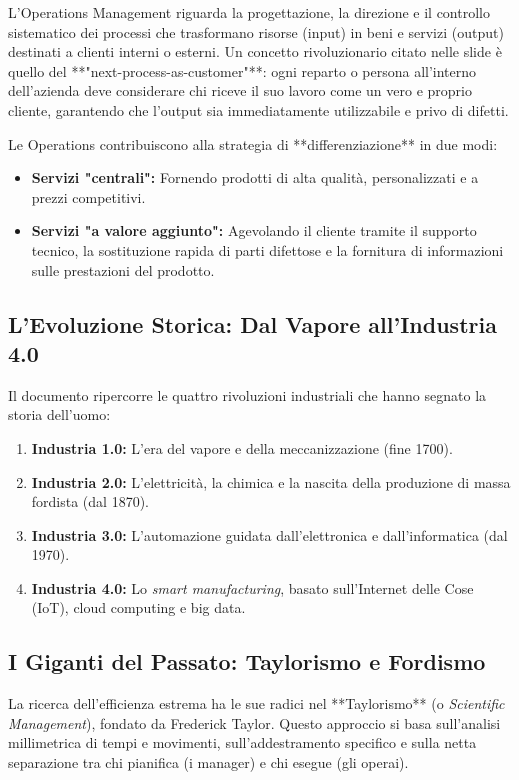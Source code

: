 \documentclass[a4paper,10pt]{article}
\begin{document}
L'Operations Management riguarda la progettazione, la direzione e il controllo sistematico dei processi che trasformano risorse (input) in beni e servizi (output) destinati a clienti interni o esterni. Un concetto rivoluzionario citato nelle slide è quello del **"next-process-as-customer"**: ogni reparto o persona all'interno dell'azienda deve considerare chi riceve il suo lavoro come un vero e proprio cliente, garantendo che l'output sia immediatamente utilizzabile e privo di difetti.

Le Operations contribuiscono alla strategia di **differenziazione** in due modi:
\begin{itemize}
    \item \textbf{Servizi "centrali":} Fornendo prodotti di alta qualità, personalizzati e a prezzi competitivi.
    \item \textbf{Servizi "a valore aggiunto":} Agevolando il cliente tramite il supporto tecnico, la sostituzione rapida di parti difettose e la fornitura di informazioni sulle prestazioni del prodotto.
\end{itemize}

\subsection*{L'Evoluzione Storica: Dal Vapore all'Industria 4.0}

Il documento ripercorre le quattro rivoluzioni industriali che hanno segnato la storia dell'uomo:
\begin{enumerate}
    \item \textbf{Industria 1.0:} L'era del vapore e della meccanizzazione (fine 1700).
    \item \textbf{Industria 2.0:} L'elettricità, la chimica e la nascita della produzione di massa fordista (dal 1870).
    \item \textbf{Industria 3.0:} L'automazione guidata dall'elettronica e dall'informatica (dal 1970).
    \item \textbf{Industria 4.0:} Lo \textit{smart manufacturing}, basato sull'Internet delle Cose (IoT), cloud computing e big data.
\end{enumerate}

\subsection*{I Giganti del Passato: Taylorismo e Fordismo}

La ricerca dell'efficienza estrema ha le sue radici nel **Taylorismo** (o \textit{Scientific Management}), fondato da Frederick Taylor. Questo approccio si basa sull'analisi millimetrica di tempi e movimenti, sull'addestramento specifico e sulla netta separazione tra chi pianifica (i manager) e chi esegue (gli operai).
\end{document}

